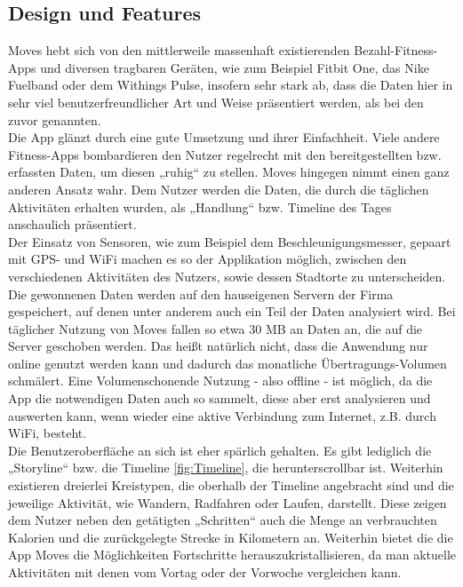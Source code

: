 \subsection{Design und Features}
\label{ch:Apps:sec:Moves:subsec:DuF}

Moves hebt sich von den mittlerweile massenhaft existierenden Bezahl-Fitness-Apps und diversen tragbaren Geräten, wie zum Beispiel Fitbit One, das Nike Fuelband oder dem Withings Pulse, insofern sehr stark ab, dass die Daten hier in sehr viel benutzerfreundlicher Art und Weise präsentiert werden, als bei den zuvor genannten.
\\
Die App glänzt durch eine gute Umsetzung und ihrer Einfachheit. 
Viele andere Fitness-Apps bombardieren den Nutzer regelrecht mit den bereitgestellten bzw. erfassten Daten, um diesen „ruhig“ zu stellen. 
Moves hingegen nimmt einen ganz anderen Ansatz wahr. 
Dem Nutzer werden die Daten, die durch die täglichen Aktivitäten erhalten wurden, als „Handlung“ bzw. Timeline des Tages anschaulich präsentiert.
\\
Der Einsatz von Sensoren, wie zum Beispiel dem Beschleunigungsmesser, gepaart mit GPS- und WiFi machen es so der Applikation möglich, zwischen den verschiedenen Aktivitäten des Nutzers, sowie dessen Stadtorte zu unterscheiden. 
Die gewonnenen Daten werden auf den hauseigenen Servern der Firma gespeichert, auf denen unter anderem auch ein Teil der Daten analysiert wird. 
Bei täglicher Nutzung von Moves fallen so etwa 30 MB an Daten an, die auf die Server geschoben werden. 
Das heißt natürlich nicht, dass die Anwendung nur online genutzt werden kann und dadurch das monatliche Übertragungs-Volumen schmälert. 
Eine Volumenschonende Nutzung - also offline - ist möglich, da die App die notwendigen Daten auch so sammelt, diese aber erst analysieren und auswerten kann, wenn wieder eine aktive Verbindung zum Internet, z.B. durch WiFi, besteht.   
\\
Die Benutzeroberfläche an sich ist eher spärlich gehalten. 
Es gibt lediglich die „Storyline“ bzw. die Timeline \ref{fig:Timeline}, die herunterscrollbar ist. 
Weiterhin existieren dreierlei Kreistypen, die oberhalb der Timeline angebracht sind und die jeweilige Aktivität, wie Wandern, Radfahren oder Laufen, darstellt. 
Diese zeigen dem Nutzer neben den getätigten „Schritten“ auch die Menge an verbrauchten Kalorien und die zurückgelegte Strecke in Kilometern an. 
Weiterhin bietet die die App Moves die Möglichkeiten Fortschritte herauszukristallisieren, da man aktuelle Aktivitäten mit denen vom Vortag oder der Vorwoche vergleichen kann.   
\\

